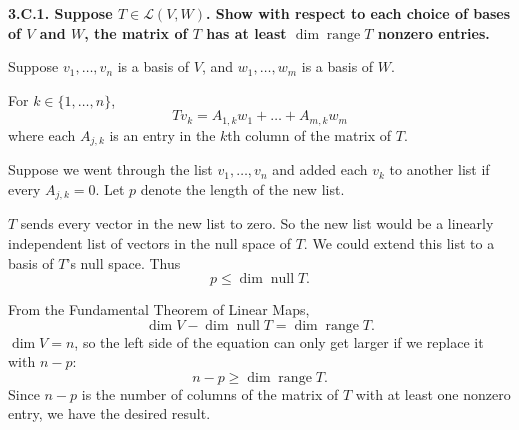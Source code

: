 \documentclass[a5paper]{article}
\begin{document}
\newcommand   \C           {\mathbf{C}}
\newcommand   \R           {\mathbf{R}}
\renewcommand \L           {\mathcal{L}}
\newcommand   \F           {\mathbf{F}}
\renewcommand \P           {\mathcal{P}}
\newcommand   \question[1] {\textbf{\boldmath#1\unboldmath}\par}
\newcommand   \op          {\operatorname}

\question{
    3.C.1.
    Suppose $T \in \L(V, W)$.
    Show with respect to each choice of bases of $V$ and $W$, the matrix of $T$ has at least $\op{dim} \op{range} T$ nonzero entries.
}

    Suppose $v_1,\dots,v_n$ is a basis of $V$, and $w_1,\dots,w_m$ is a basis of $W$.

    For $k \in \{1,\dots,n\}$,
\begin{equation*}
        Tv_k = A_{1,k}w_1 + \dots + A_{m,k}w_m
\end{equation*}
    where each $A_{j,k}$ is an entry in the $k$th column of the matrix of $T$.

    Suppose we went through the list $v_1,\dots,v_n$ and added each $v_k$ to another list if every $A_{j,k} = 0$.
    Let $p$ denote the length of the new list.

    $T$ sends every vector in the new list to zero.
    So the new list would be a linearly independent list of vectors in the null space of $T$.
    We could extend this list to a basis of $T$'s null space.
    Thus
\begin{equation*}
        p \le \op{dim}\op{null}T .
\end{equation*}

    From the Fundamental Theorem of Linear Maps,
\begin{equation*}
        \op{dim}V - \op{dim}\op{null}T = \op{dim}\op{range}T .
\end{equation*}
    $\op{dim}V = n$, so the left side of the equation can only get larger if we replace it with $n - p$:
\begin{equation*}
        n - p \ge \op{dim}\op{range}T .
\end{equation*}
    Since $n - p$ is the number of columns of the matrix of $T$ with at least one nonzero entry, we have the desired result.
\end{document}
